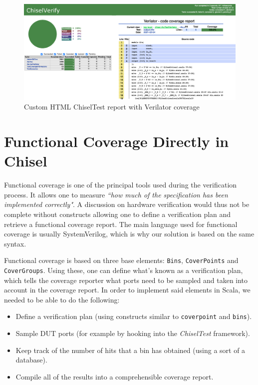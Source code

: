 \documentclass[runningheads]{llncs}
\begin{document}
\begin{figure}
\centering
\includegraphics[width=\linewidth]{ChiselverifyHtml.eps}
\caption{Custom HTML ChiselTest report with Verilator coverage}
\label{fig:customhtmlreport}
\end{figure}

\section{Functional Coverage Directly in Chisel}

Functional coverage is one of the principal tools used during the verification process. It allows one to measure \textit{``how much of the specification has been implemented correctly"}. A discussion on hardware verification would thus not be complete without constructs allowing one to define a verification plan and retrieve a functional coverage report. The main language used for functional coverage is usually SystemVerilog, which is why our solution is based on the same syntax. 

Functional coverage is based on three base elements: \texttt{Bins}, \texttt{CoverPoints} and \texttt{CoverGroups}. Using these, one can define what's known as a verification plan, which tells the coverage reporter what ports need to be sampled and taken into account in the coverage report.
In order to implement said elements in Scala, we needed to be able to do the following:
\begin{itemize}
\item Define a verification plan (using constructs similar to \texttt{coverpoint} and \texttt{bins}).
\item Sample DUT ports (for example by hooking into the \textit{ChiselTest} framework).
\item Keep track of the number of hits that a bin has obtained (using a sort of a database).
\item Compile all of the results into a comprehensible coverage report.
\end{itemize}
\end{document}
